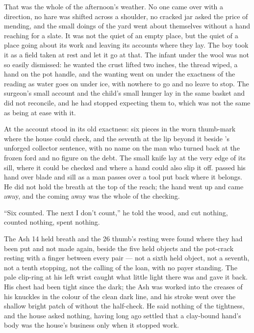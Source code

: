 That was the whole of the afternoon's weather. No one came over  with a direction, no hare was shifted across a shoulder, no cracked jar asked the price of mending, and the small doings of the yard went about themselves without a hand reaching for a slate. It was not the quiet of an empty place, but the quiet of a place going about its work and leaving its accounts where they lay. The boy took it as a field taken at rest and let it go at that. The infant under the wool was not so easily dismissed: he wanted the crust lifted two inches, the thread wiped, a hand on the pot handle, and the wanting went on under the exactness of the reading as water goes on under ice, with nowhere to go and no leave to stop. The surgeon's small account and the child's small hunger lay in the same basket and did not reconcile, and he had stopped expecting them to, which was not the same as being at ease with it.

\scenebreak

At  the account stood in its old exactness: six pieces in the worn thumb-mark where the house could check, and the seventh at the lip beyond it beside 's unforged collector sentence, with no name on the man who turned back at the frozen ford and no figure on the debt. The small knife lay at the very edge of its sill, where it could be checked and where a hand could also slip it off.  passed his hand over blade and sill as a man passes over a tool put back where it belongs. He did not hold the breath at the top of the reach; the hand went up and came away, and the coming away was the whole of the checking.

“Six counted. The next I don't count,” he told the wood, and cut nothing, counted nothing, spent nothing.

The Ash 14 held breath and the  26 thumb's resting were found where they had been put and not made again, beside the five held objects and the pot-crack resting with a finger between every pair — not a sixth held object, not a seventh, not a tenth stopping, not the calling of the loan, with no payer standing. The pale clip-ring at his left wrist caught what little light there was and gave it back. His chest had been tight since the dark; the Ash was worked into the creases of his knuckles in the colour of the clean dark line, and his stroke went over the shallow bright patch of  without the half-check. He said nothing of the tightness, and the house asked nothing, having long ago settled that a clay-bound hand's body was the house's business only when it stopped work.

